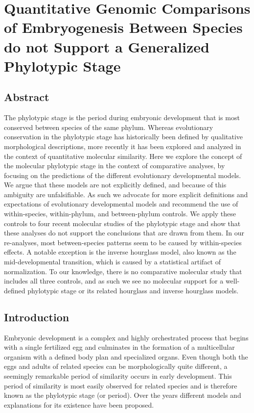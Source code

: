 \chapter{Quantitative Genomic Comparisons of Embryogenesis Between Species do not Support a Generalized Phylotypic Stage}\thumbforchapter
{}
\newpage

\section{Abstract}

The phylotypic stage is the period during embryonic development that is most conserved between species of the same phylum. Whereas evolutionary conservation in the phylotypic stage has historically been defined by qualitative morphological descriptions, more recently it has been explored and analyzed in the context of quantitative molecular similarity. Here we explore the concept of the molecular phylotypic stage in the context of comparative analyses, by focusing on the predictions of the different evolutionary developmental models. We argue that these models are not explicitly defined, and because of this ambiguity are unfalsifiable. As such we advocate for more explicit definitions and expectations of evolutionary developmental models and recommend the use of within-species, within-phylum, and between-phylum controls. We apply these controls to four recent molecular studies of the phylotypic stage and show that these analyses do not support the conclusions that are drawn from them. In our re-analyses, most between-species patterns seem to be caused by within-species effects. A notable exception is the inverse hourglass model, also known as the mid-developmental transition, which is caused by a statistical artifact of normalization. To our knowledge, there is no comparative molecular study that includes all three controls, and as such we see no molecular support for a well-defined phylotypic stage or its related hourglass and inverse hourglass models.

\section{Introduction}

Embryonic development is a complex and highly orchestrated process that begins with a single fertilized egg and culminates in the formation of a multicellular organism with a defined body plan and specialized organs. Even though both the eggs and adults of related species can be morphologically quite different, a seemingly remarkable period of similarity occurs in early development. This period of similarity is most easily observed for related species and is therefore known as the phylotypic stage (or period\cite{Richardson1995}). Over the years different models and explanations for its existence have been proposed\cite{Kalinka2012,Irie2014,Drost2017}.

